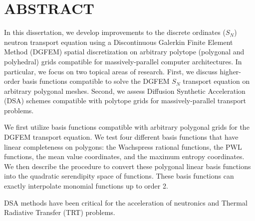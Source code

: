 %
%
%

\chapter*{ABSTRACT}

\pagestyle{plain} %
\setcounter{page}{2}

\indent In this dissertation, we develop improvements to the discrete ordinates ($S_N$) neutron transport equation using a Discontinuous Galerkin Finite Element Method (DGFEM) spatial discretization on arbitrary polytope (polygonal and polyhedral) grids compatible for massively-parallel computer architectures. In particular, we focus on two topical areas of research. First, we discuss higher-order basis functions compatible to solve the DGFEM $S_N$ transport equation on arbitrary polygonal meshes. Second, we assess Diffusion Synthetic Acceleration (DSA) schemes compatible with polytope grids for massively-parallel transport problems.

We first utilize basis functions compatible with arbitrary polygonal grids for the DGFEM transport equation. We test four different basis functions that have linear completeness on polygons: the Wachspress rational functions, the PWL functions, the mean value coordinates, and the maximum entropy coordinates. We then describe the procedure to convert these polygonal linear basis functions into the quadratic serendipity space of functions. These basis functions can exactly interpolate monomial functions up to order 2.

DSA methods have been critical for the acceleration of neutronics and Thermal Radiative Transfer (TRT) problems. 

\pagebreak{}
